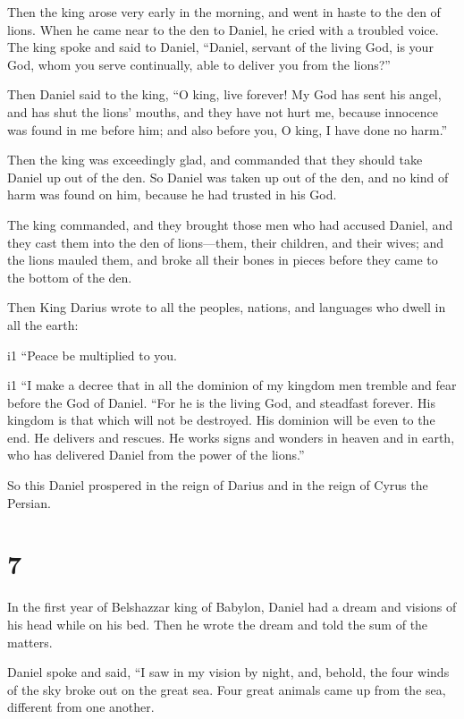 Then the king arose very early in the morning, and went
in haste to the den of lions.  When he came near to the
den to Daniel, he cried with a troubled voice. The king spoke and said
to Daniel, ``Daniel, servant of the living God, is your God, whom you
serve continually, able to deliver you from the lions?''

 Then Daniel said to the king, ``O king, live forever!
 My God has sent his angel, and has shut the lions'
mouths, and they have not hurt me, because innocence was found in me
before him; and also before you, O king, I have done no harm.''

 Then the king was exceedingly glad, and commanded that
they should take Daniel up out of the den. So Daniel was taken up out of
the den, and no kind of harm was found on him, because he had trusted in
his God.

 The king commanded, and they brought those men who had
accused Daniel, and they cast them into the den of lions---them, their
children, and their wives; and the lions mauled them, and broke all
their bones in pieces before they came to the bottom of the den.

 Then King Darius wrote to all the peoples, nations, and
languages who dwell in all the earth:

i1 ``Peace be multiplied to you.

i1  ``I make a decree that in all the dominion of my
kingdom men tremble and fear before the God of Daniel. ``For he is the
living God, and steadfast forever. His kingdom is that which will not be
destroyed. His dominion will be even to the end.  He
delivers and rescues. He works signs and wonders in heaven and in earth,
who has delivered Daniel from the power of the lions.''

 So this Daniel prospered in the reign of Darius and in
the reign of Cyrus the Persian.

\hypertarget{section-6}{%
\section{7}\label{section-6}}

 In the first year of Belshazzar king of Babylon, Daniel
had a dream and visions of his head while on his bed. Then he wrote the
dream and told the sum of the matters.

 Daniel spoke and said, ``I saw in my vision by night,
and, behold, the four winds of the sky broke out on the great sea.
 Four great animals came up from the sea, different from
one another.

